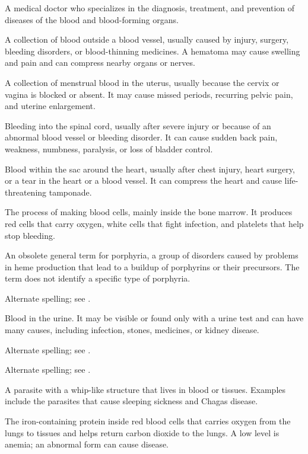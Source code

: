  A medical doctor who specializes in the diagnosis, treatment, and prevention of diseases
of the blood and blood-forming organs.

 A collection of blood outside a blood vessel, usually caused by injury, surgery, bleeding disorders, or blood-thinning medicines. A hematoma may cause swelling and pain and can compress nearby organs or nerves.

 A collection of menstrual blood in the uterus, usually because the cervix or vagina is blocked or absent. It may cause missed periods, recurring pelvic pain, and uterine enlargement.

 Bleeding into the spinal cord, usually after severe injury or because of an abnormal blood vessel or bleeding disorder. It can cause sudden back pain, weakness, numbness, paralysis, or loss of bladder control.

 Blood within the sac around the heart, usually after chest injury, heart surgery, or a tear in the heart or a blood vessel. It can compress the heart and cause life-threatening tamponade.

 The process of making blood cells, mainly inside the bone marrow. It produces red cells that carry oxygen, white cells that fight infection, and platelets that help stop bleeding.

 An obsolete general term for porphyria, a group of disorders caused by problems in heme production that lead to a buildup of porphyrins or their precursors. The term does not identify a specific type of porphyria.

 Alternate spelling; see .

 Blood in the urine. It may be visible or found only with a urine test and can have many causes, including infection, stones, medicines, or kidney disease.

 Alternate spelling; see .

 Alternate spelling; see .

 A parasite with a whip-like structure that lives in blood or tissues. Examples include the parasites that cause sleeping sickness and Chagas disease.

 The iron-containing protein inside red blood cells that carries oxygen from the lungs to tissues and helps return carbon dioxide to the lungs. A low level is anemia; an abnormal form can cause disease.

